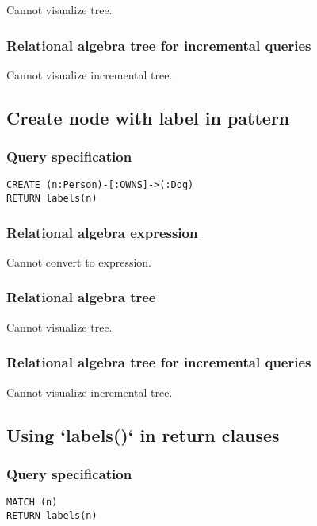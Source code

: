 Cannot visualize tree.

\subsubsection*{Relational algebra tree for incremental queries}

Cannot visualize incremental tree.

\subsection{Create node with label in pattern}

\subsubsection*{Query specification}

\begin{lstlisting}
CREATE (n:Person)-[:OWNS]->(:Dog)
RETURN labels(n)
\end{lstlisting}

\subsubsection*{Relational algebra expression}

Cannot convert to expression.

\subsubsection*{Relational algebra tree}

Cannot visualize tree.

\subsubsection*{Relational algebra tree for incremental queries}

Cannot visualize incremental tree.

\subsection{Using `labels()` in return clauses}

\subsubsection*{Query specification}

\begin{lstlisting}
MATCH (n)
RETURN labels(n)
\end{lstlisting}

